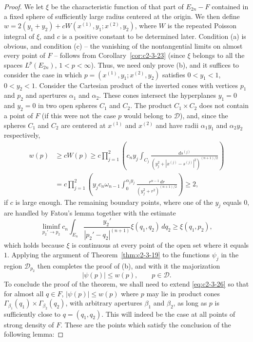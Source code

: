 \begin{proof}
We let $\xi$ be the characteristic function of that part of $E_{2n} - F$ contained in a fixed sphere of sufficiently large radius centered at the origin. We then define $w = 2(y_1 + y_2) + cW(x^{(1)}, y_1; x^{(2)}, y_2)$, where $W$ is the repeated Poisson integral of $\xi$, and $c$ is a positive constant to be determined later. Condition (a) is obvious, and condition (c) -- the vanishing of the nontangential limits on almost every point of $F$ -- follows from Corollary~\ref{cor:c2-3-23} (since $\xi$ belongs to all the spaces $L^p(E_{2n})$, $1 < p < \infty$). Thus, we need only prove (b), and it suffices to consider the case in which $p = (x^{(1)}, y_1; x^{(2)}, y_2)$ satisfies $0 < y_1 < 1$, $0 < y_2 < 1$. Consider the Cartesian product of the inverted cones with vertices $p_1$ and $p_2$ and apertures $\alpha_1$ and $\alpha_2$. These cones intersect the hyperplanes $y_1 = 0$ and $y_2 = 0$ in two open spheres $C_1$ and $C_2$. The product $C_1 \times C_2$ does not contain a point of $F$ (if this were not the case $p$ would belong to $\mathcal{D}$), and, since the spheres $C_1$ and $C_2$ are centered at $x^{(1)}$ and $x^{(2)}$ and have radii $\alpha_1 y_1$ and $\alpha_2 y_2$ respectively,
\[
\begin{aligned}
w(p) &\geq cW(p) \geq c \prod_{j=1}^2 \left(c_n y_j \int_{C_j} \frac{ds^{(j)}}{(y_j^2 + |x^{(j)} - s^{(j)}|^2)^{(n+1)/2}}\right) \\
&= c \prod_{j=1}^2 \left(y_j c_n \omega_{n-1} \int_0^{\alpha_j y_j} \frac{r^{n-1}\,dr}{(y_j^2 + r^2)^{(n+1)/2}}\right) \geq 2,
\end{aligned}
\]
if $c$ is large enough. The remaining boundary points, where one of the $y_j$ equals $0$, are handled by Fatou's lemma together with the estimate
\begin{equation}\label{eq:c2-3-25}
\liminf_{p_2' \to p_2} c_n \int_{E_n} \frac{y_2'}{|p_2' - q_2|^{(n+1)}} \xi(q_1, q_2)\,dq_2 \geq \xi(q_1, p_2),
\end{equation}
which holds because $\xi$ is continuous at every point of the open set where it equals $1$. Applying the argument of Theorem~\ref{thm:c2-3-19} to the functions $\psi_j$ in the region $\mathcal{D}_{p_2}$ then completes the proof of (b), and with it the majorization
\begin{equation}\label{eq:c2-3-26}
|\psi(p)| \leq w(p), \qquad p \in \mathcal{D}.
\end{equation}
To conclude the proof of the theorem, we shall need to extend \eqref{eq:c2-3-26} so that for almost all $q \in F$, $|\psi(p)| \leq w(p)$ where $p$ may lie in product cones $\Gamma_{\beta_1}(q_1) \times \Gamma_{\beta_2}(q_2)$, with arbitrary apertures $\beta_1$ and $\beta_2$, as long as $p$ is sufficiently close to $q = (q_1, q_2)$. This will indeed be the case at all points of strong density of $F$. These are the points which satisfy the conclusion of the following lemma:
\end{proof}

